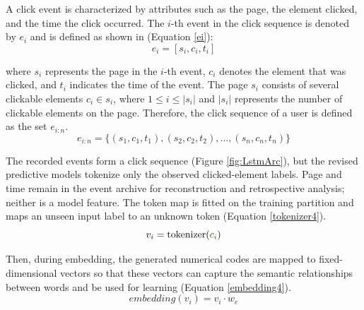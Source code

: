 \documentclass[sn-mathphys-num, Numbered]{sn-jnl}%
\theoremstyle{thmstyleone}%
\theoremstyle{thmstyletwo}%
\theoremstyle{thmstylethree}%
\providecommand{\DIFadd}[1]{{\protect\color{green!40!black}#1}} %
\providecommand{\DIFdel}[1]{}                      %
\providecommand{\DIFaddbegin}{} %
\providecommand{\DIFaddend}{} %
\providecommand{\DIFdelbegin}{} %
\providecommand{\DIFdelend}{} %
\newcommand{\DIFscaledelfig}{0.5}
\newlength{\DIFdelgraphicswidth} %
\newlength{\DIFdelgraphicsheight} %
\newcommand{\DIFaddincludegraphics}[2][]{{\color{blue}\fbox{\DIFOincludegraphics[#1]{#2}}}} %
\newcommand{\DIFdelincludegraphics}[2][]{%
\sbox{\DIFdelgraphicsbox}{\DIFOincludegraphics[#1]{#2}}%
\settoboxwidth{\DIFdelgraphicswidth}{\DIFdelgraphicsbox} %
\settoboxtotalheight{\DIFdelgraphicsheight}{\DIFdelgraphicsbox} %
\scalebox{\DIFscaledelfig}{%
\parbox[b]{\DIFdelgraphicswidth}{\usebox{\DIFdelgraphicsbox}\\[-\baselineskip] \rule{\DIFdelgraphicswidth}{0em}}\llap{\resizebox{\DIFdelgraphicswidth}{\DIFdelgraphicsheight}{%
\setlength{\unitlength}{\DIFdelgraphicswidth}%
\begin{picture}(1,1)%
\thicklines\linethickness{2pt} %
{\color[rgb]{1,0,0}\put(0,0){\framebox(1,1){}}}%
{\color[rgb]{1,0,0}\put(0,0){\line( 1,1){1}}}%
{\color[rgb]{1,0,0}\put(0,1){\line(1,-1){1}}}%
\end{picture}%
}\hspace*{3pt}}} %
} %
\DeclareRobustCommand{\DIFaddbegin}{\DIFOaddbegin \let\includegraphics\DIFaddincludegraphics} %
\DeclareRobustCommand{\DIFaddend}{\DIFOaddend \let\includegraphics\DIFOincludegraphics} %
\DeclareRobustCommand{\DIFdelbegin}{\DIFOdelbegin \let\includegraphics\DIFdelincludegraphics} %
\DeclareRobustCommand{\DIFdelend}{\DIFOaddend \let\includegraphics\DIFOincludegraphics} %
\begin{document}
A click event is characterized by attributes such as the page, the element clicked, and the time the click occurred.
The $i$-th event in the click sequence is denoted by $e_i$ and is defined as shown in (Equation \ref{ei}):
\begin{equation}\label{ei}
	e_i=[s_i, c_i, t_i]
\end{equation}

where $s_i$ represents the page in the $i$-th event, $c_i$ denotes the element that was clicked, and $t_i$ indicates the time of the event.
The page \( s_i \) consists of several clickable elements \( c_i \in s_i \), where \( 1 \leq i \leq |s_i| \) and \( |s_i| \) represents the number of clickable elements on the page. Therefore, the click sequence of a user is defined as the set \( e_{i:n} \).
\begin{equation*}\label{ein}
	e_{i:n}=\{(s_1, c_1, t_1), (s_2, c_2, t_2), \ldots, (s_n, c_n, t_n)\}
\end{equation*}

\DIFdelbegin \DIFdel{In this formula, the user click events are extended and written as events from $i$ to $n$, forming }\DIFdelend \DIFaddbegin \DIFadd{The recorded events form }\DIFaddend a click sequence (Figure \ref{fig:LstmArc})\DIFdelbegin \DIFdel{. Subsequently, tokenization is applied to the elements of the user click sequence ${e_{i:n}}$ so that the pages and clickable elements are converted into numerical codes, allowing the model to process them }\DIFdelend \DIFaddbegin \DIFadd{, but the revised predictive models tokenize only the observed clicked-element labels. Page and time remain in the event archive for reconstruction and retrospective analysis; neither is a model feature. The token map is fitted on the training partition and maps an unseen input label to an unknown token }\DIFaddend (Equation \ref{tokenizer4}).
\DIFdelbegin \DIFdel{The role of the tokenizer is to map each element to a unique number, so that tokens can be provided as numerical input to the model.
}\DIFdelend \begin{equation}\label{tokenizer4}
	v_i = \DIFdelbegin \DIFdel{tokenizer}\DIFdelend \DIFaddbegin \operatorname{tokenizer}\DIFaddend (\DIFdelbegin %
\DIFdel{e_{i:n}}%
\DIFdelend \DIFaddbegin \DIFadd{c_i}\DIFaddend )
\end{equation}

Then, during embedding, the generated numerical codes are mapped to fixed-dimensional vectors so that these vectors can capture the semantic relationships between words and be used for learning (Equation \ref{embedding4}).
\begin{equation}\label{embedding4}
	embedding(v_i)= v_i \cdot w_e
\end{equation}
\end{document}
